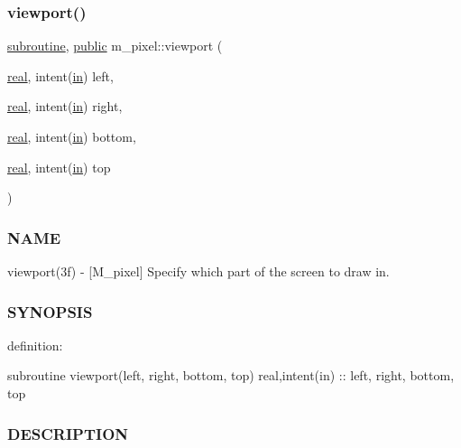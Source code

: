 \mbox{\label{namespacem__pixel_a43247343cd316e3aa075b44b5166e2e9}} 
\subsubsection{\texorpdfstring{viewport()}{viewport()}}
{\footnotesize\ttfamily \hyperlink{M__stopwatch_83_8txt_acfbcff50169d691ff02d4a123ed70482}{subroutine}, \hyperlink{M__stopwatch_83_8txt_a2f74811300c361e53b430611a7d1769f}{public} m\+\_\+pixel\+::viewport (\begin{DoxyParamCaption}\item[{\hyperlink{read__watch_83_8txt_abdb62bde002f38ef75f810d3a905a823}{real}, intent(\hyperlink{M__journal_83_8txt_afce72651d1eed785a2132bee863b2f38}{in})}]{left,  }\item[{\hyperlink{read__watch_83_8txt_abdb62bde002f38ef75f810d3a905a823}{real}, intent(\hyperlink{M__journal_83_8txt_afce72651d1eed785a2132bee863b2f38}{in})}]{right,  }\item[{\hyperlink{read__watch_83_8txt_abdb62bde002f38ef75f810d3a905a823}{real}, intent(\hyperlink{M__journal_83_8txt_afce72651d1eed785a2132bee863b2f38}{in})}]{bottom,  }\item[{\hyperlink{read__watch_83_8txt_abdb62bde002f38ef75f810d3a905a823}{real}, intent(\hyperlink{M__journal_83_8txt_afce72651d1eed785a2132bee863b2f38}{in})}]{top }\end{DoxyParamCaption})}



\subsubsection*{N\+A\+ME}

viewport(3f) -\/ \mbox{[}M\+\_\+pixel\mbox{]} Specify which part of the screen to draw in. 

\subsubsection*{S\+Y\+N\+O\+P\+S\+IS}

definition\+:

subroutine viewport(left, right, bottom, top) real,intent(in) \+:\+: left, right, bottom, top

\subsubsection*{D\+E\+S\+C\+R\+I\+P\+T\+I\+ON}

